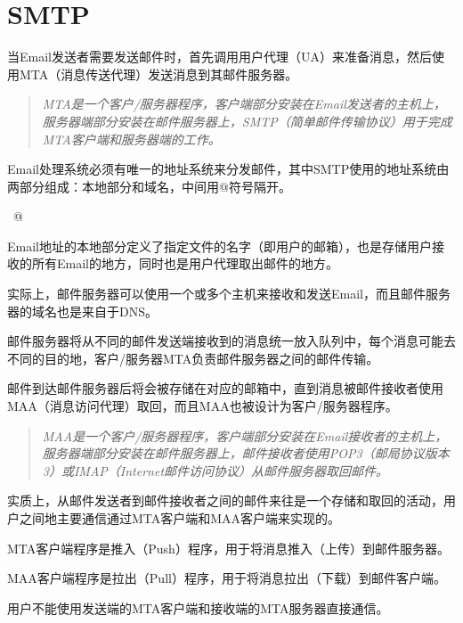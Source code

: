 \section{SMTP}

当Email发送者需要发送邮件时，首先调用用户代理（UA）来准备消息，然后使用MTA（消息传送代理）发送消息到其邮件服务器。

\begin{quote}
\textsl{MTA是一个客户/服务器程序，客户端部分安装在Email发送者的主机上，服务器端部分安装在邮件服务器上，SMTP（简单邮件传输协议）用于完成MTA客户端和服务器端的工作。}
\end{quote}




Email处理系统必须有唯一的地址系统来分发邮件，其中SMTP使用的地址系统由两部分组成：本地部分和域名，中间用@符号隔开。
\begin{center}
\mbox{~@~}
\end{center}


Email地址的本地部分定义了指定文件的名字（即用户的邮箱），也是存储用户接收的所有Email的地方，同时也是用户代理取出邮件的地方。

实际上，邮件服务器可以使用一个或多个主机来接收和发送Email，而且邮件服务器的域名也是来自于DNS。

邮件服务器将从不同的邮件发送端接收到的消息统一放入队列中，每个消息可能去不同的目的地，客户/服务器MTA负责邮件服务器之间的邮件传输。

邮件到达邮件服务器后将会被存储在对应的邮箱中，直到消息被邮件接收者使用MAA（消息访问代理）取回，而且MAA也被设计为客户/服务器程序。

\begin{quote}
\textsl{MAA是一个客户/服务器程序，客户端部分安装在Email接收者的主机上，服务器端部分安装在邮件服务器上，邮件接收者使用POP3（邮局协议版本3）或IMAP（Internet邮件访问协议）从邮件服务器取回邮件。}
\end{quote}

实质上，从邮件发送者到邮件接收者之间的邮件来往是一个存储和取回的活动，用户之间地主要通信通过MTA客户端和MAA客户端来实现的。

\begin{compactitem}
\item MTA客户端程序是推入（Push）程序，用于将消息推入（上传）到邮件服务器。
\item MAA客户端程序是拉出（Pull）程序，用于将消息拉出（下载）到邮件客户端。
\item 用户不能使用发送端的MTA客户端和接收端的MTA服务器直接通信。
\end{compactitem}

